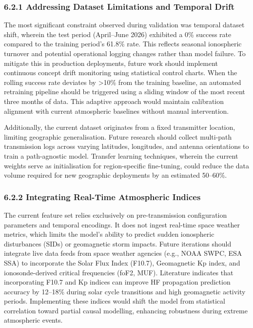 \subsubsection{6.2.1 Addressing Dataset Limitations and Temporal
Drift}\label{addressing-dataset-limitations-and-temporal-drift}

The most significant constraint observed during validation was temporal
dataset shift, wherein the test period (April--June 2026) exhibited a
0\% success rate compared to the training period's 61.8\% rate. This
reflects seasonal ionospheric turnover and potential operational logging
changes rather than model failure. To mitigate this in production
deployments, future work should implement continuous concept drift
monitoring using statistical control charts. When the rolling success
rate deviates by \textgreater10\% from the training baseline, an
automated retraining pipeline should be triggered using a sliding window
of the most recent three months of data. This adaptive approach would
maintain calibration alignment with current atmospheric baselines
without manual intervention.

Additionally, the current dataset originates from a fixed transmitter
location, limiting geographic generalisation. Future research should
collect multi-path transmission logs across varying latitudes,
longitudes, and antenna orientations to train a path-agnostic model.
Transfer learning techniques, wherein the current weights serve as
initialisation for region-specific fine-tuning, could reduce the data
volume required for new geographic deployments by an estimated 50--60\%.

\subsubsection{6.2.2 Integrating Real-Time Atmospheric
Indices}\label{integrating-real-time-atmospheric-indices}

The current feature set relies exclusively on pre-transmission
configuration parameters and temporal encodings. It does not ingest
real-time space weather metrics, which limits the model's ability to
predict sudden ionospheric disturbances (SIDs) or geomagnetic storm
impacts. Future iterations should integrate live data feeds from space
weather agencies (e.g., NOAA SWPC, ESA SSA) to incorporate the Solar
Flux Index (F10.7), Geomagnetic Kp index, and ionosonde-derived critical
frequencies (foF2, MUF). Literature indicates that incorporating F10.7
and Kp indices can improve HF propagation prediction accuracy by
12--18\% during solar cycle transitions and high geomagnetic activity
periods. Implementing these indices would shift the model from
statistical correlation toward partial causal modelling, enhancing
robustness during extreme atmospheric events.

